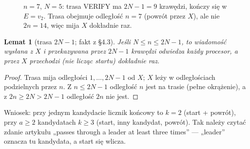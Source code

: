 \documentclass[11pt,a4paper]{article}
\newtheorem{lemat}{Lemat}
\theoremstyle{definition}
\newcommand{\msg}[1]{\textsf{\small #1}}
\begin{document}
\begin{figure}[h]
\centering
{}
\caption{$n=7$, $N=5$: trasa \msg{VERIFY} ma $2N-1=9$ krawędzi, kończy się w $E=v_2$. Trasa obejmuje
odległość $n=7$ (powrót przez $X$), ale nie $2n=14$, więc mija $X$ dokładnie raz.}
\label{fig:trasa}
\end{figure}

\begin{lemat}[trasa $2N-1$; fakt z §4.3]\label{lem:trasa}
Jeśli $N\le n\le 2N-1$, to wiadomość wysłana z $X$ i przekazywana przez $2N-1$ krawędzi odwiedza każdy
procesor, a przez $X$ przechodzi (nie licząc startu) dokładnie raz.
\end{lemat}
\begin{proof}
Trasa mija odległości $1,\dots,2N-1$ od $X$; $X$ leży w odległościach podzielnych przez $n$.
Z $n\le2N-1$ odległość $n$ jest na trasie (pełne okrążenie), a z $2n\ge 2N>2N-1$ odległość $2n$ nie jest.
\end{proof}

\noindent Wniosek: przy jednym kandydacie licznik końcowy to $k=2$ (start + powrót), przy $a\ge2$ kandydatach
$k\ge3$ (start, inny kandydat, powrót). Tak należy czytać zdanie artykułu „passes through a leader at
least three times” — „leader” oznacza tu kandydata, a start się wlicza.
\end{document}
